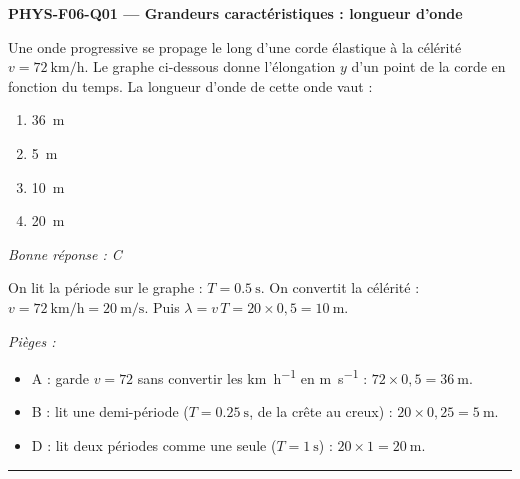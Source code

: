 \documentclass[11pt,a4paper]{article}
\begin{document}

\noindent\textbf{PHYS-F06-Q01 --- Grandeurs caractéristiques : longueur d'onde}\par
Une onde progressive se propage le long d'une corde élastique à la célérité $v = \qty{72}{\kilo\metre\per\hour}$. Le graphe ci-dessous donne l'élongation $y$ d'un point de la corde en fonction du temps. La longueur d'onde de cette onde vaut :
\begin{center}
\end{center}
\begin{enumerate}[label=\Alph*)]
\item \qty{36}{\metre}
\item \qty{5}{\metre}
\item \qty{10}{\metre}
\item \qty{20}{\metre}
\end{enumerate}
\textit{Bonne réponse : C}\par
On lit la période sur le graphe : $T = \qty{0.5}{\second}$. On convertit la célérité : $v = \qty{72}{\kilo\metre\per\hour} = \qty{20}{\metre\per\second}$. Puis $\lambda = v\,T = 20 \times 0{,}5 = \qty{10}{\metre}$.\par
\textit{Pièges :}
\begin{itemize}
\item A : garde $v = 72$ sans convertir les \si{\kilo\metre\per\hour} en \si{\metre\per\second} : $72\times0{,}5 = \qty{36}{\metre}$.
\item B : lit une demi-période ($T = \qty{0.25}{\second}$, de la crête au creux) : $20\times0{,}25 = \qty{5}{\metre}$.
\item D : lit deux périodes comme une seule ($T = \qty{1}{\second}$) : $20\times1 = \qty{20}{\metre}$.
\end{itemize}
\vspace{8pt}\hrule\vspace{8pt}
\end{document}
